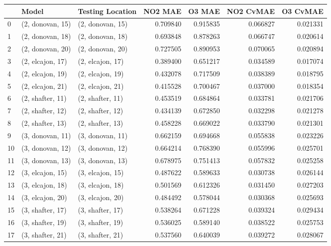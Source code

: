 \begin{tabular}{lllrrrr}
\toprule
{} &             Model &  Testing Location &   NO2 MAE &    O3 MAE &  NO2 CvMAE &  O3 CvMAE \\
\midrule
0  &  (2, donovan, 15) &  (2, donovan, 15) &  0.709840 &  0.915835 &   0.066827 &  0.021331 \\
1  &  (2, donovan, 18) &  (2, donovan, 18) &  0.693848 &  0.878263 &   0.066747 &  0.020614 \\
2  &  (2, donovan, 20) &  (2, donovan, 20) &  0.727505 &  0.890953 &   0.070065 &  0.020894 \\
3  &  (2, elcajon, 17) &  (2, elcajon, 17) &  0.389400 &  0.651217 &   0.034589 &  0.017074 \\
4  &  (2, elcajon, 19) &  (2, elcajon, 19) &  0.432078 &  0.717509 &   0.038389 &  0.018795 \\
5  &  (2, elcajon, 21) &  (2, elcajon, 21) &  0.415528 &  0.700467 &   0.037000 &  0.018354 \\
6  &  (2, shafter, 11) &  (2, shafter, 11) &  0.453519 &  0.684864 &   0.033781 &  0.021706 \\
7  &  (2, shafter, 12) &  (2, shafter, 12) &  0.434139 &  0.672850 &   0.032298 &  0.021278 \\
8  &  (2, shafter, 13) &  (2, shafter, 13) &  0.458228 &  0.669022 &   0.033790 &  0.021301 \\
9  &  (3, donovan, 11) &  (3, donovan, 11) &  0.662159 &  0.694668 &   0.055838 &  0.023226 \\
10 &  (3, donovan, 12) &  (3, donovan, 12) &  0.664214 &  0.768390 &   0.055996 &  0.025701 \\
11 &  (3, donovan, 13) &  (3, donovan, 13) &  0.678975 &  0.751413 &   0.057832 &  0.025258 \\
12 &  (3, elcajon, 15) &  (3, elcajon, 15) &  0.487622 &  0.589633 &   0.030738 &  0.026144 \\
13 &  (3, elcajon, 18) &  (3, elcajon, 18) &  0.501569 &  0.612326 &   0.031450 &  0.027203 \\
14 &  (3, elcajon, 20) &  (3, elcajon, 20) &  0.484492 &  0.578044 &   0.030368 &  0.025693 \\
15 &  (3, shafter, 17) &  (3, shafter, 17) &  0.538264 &  0.671228 &   0.039324 &  0.029434 \\
16 &  (3, shafter, 19) &  (3, shafter, 19) &  0.536025 &  0.589140 &   0.038522 &  0.025753 \\
17 &  (3, shafter, 21) &  (3, shafter, 21) &  0.537560 &  0.640039 &   0.039272 &  0.028067 \\

\end{tabular}
